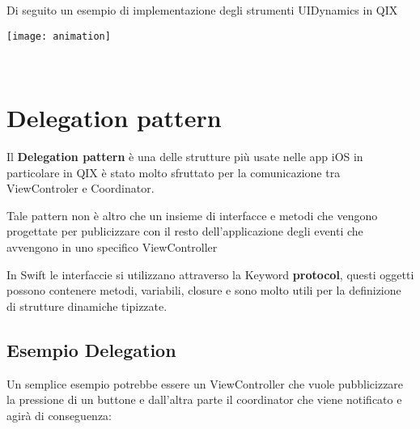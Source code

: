 Di seguito un esempio di implementazione degli strumenti UIDynamics in QIX

\begin{minipage}{\linewidth}
    \centering
    \texttt{[image: animation]}
    \label{fig:6}
\end{minipage}\\

\section{Delegation pattern}\label{delegation}

Il \textbf{Delegation pattern} è una delle strutture più usate nelle app iOS in particolare in QIX
è stato molto sfruttato per la comunicazione tra ViewControler e Coordinator.

Tale pattern non è altro che un insieme di interfacce e metodi che
vengono progettate per publicizzare con il resto dell'applicazione degli eventi che avvengono in uno specifico ViewController

In Swift le interfaccie si utilizzano attraverso la Keyword \textbf{protocol}, questi oggetti possono contenere metodi, variabili, closure
e sono molto utili per la definizione di strutture dinamiche tipizzate.

\subsection{Esempio Delegation}

Un semplice esempio potrebbe essere un ViewController che vuole
pubblicizzare la pressione di un buttone e dall'altra parte il coordinator
che viene notificato e agirà di conseguenza:

